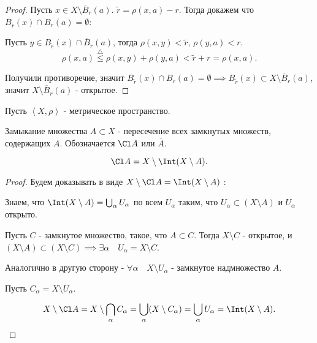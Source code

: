\begin{properties}
\begin{enumerate}
\begin{proof}
                Пусть $x\in X \setminus \overline{B}_{r}(a)$. $\tilde{r} = \rho(x, a) - r$. Тогда докажем что $B_{\tilde{r}}(x)\cap B_{r}(a) = \emptyset$:

                Пусть $y\in B_{\tilde{r}}(x)\cap \overline{B}_{r}(a)$, тогда $\rho(x, y) < \tilde{r}$, $\rho(y, a) < r$.
                \[ \rho(x, a) \overset{\triangle}{\le} \rho(x, y) + \rho(y, a) < \tilde{r} + r = \rho(x, a)  .\]

                Получили противоречие, значит $B_{\tilde{r}}(x)\cap B_{r}(a) = \emptyset \implies B_{\tilde{r}}(x) \subset X \setminus \overline{B}_{r}(a)$, значит $X \setminus \overline{B}_{r}(a)$ - открытое.
            \end{proof}
    \end{enumerate}
\end{properties}

\begin{definition} \thmslashn 

    Пусть $\left<X, \rho\right>$ - метрическое пространство.

    Замыкание множества $A \subset X$ - пересечение всех замкнутых множеств, содержащих $A$. Обозначается $\Cl A$ или $\overline{A}$.
\end{definition}

\begin{theorem} \thmslashn

    \[ \Cl A = X \setminus \Int (X \setminus A) .\]
    \begin{proof} \thmslashn
    
        Будем доказывать в виде $X \setminus \Cl A = \Int (X \setminus A)$ :

        Знаем, что $\Int (X \setminus A) = \bigcup_{\alpha} U_{\alpha}$ по всем $U_{\alpha}$ таким, что $U_{\alpha} \subset (X \setminus A)$ и $U_{\alpha}$ открыто.

        Пусть $C$ - замкнутое множество, такое, что $A \subset C$. Тогда $X \setminus C$ - открытое, и $(X \setminus A) \subset (X \setminus C) \implies \exists{\alpha}\quad U_{\alpha} = X \setminus C$.

        Аналогично в другую сторону - $\forall{\alpha}\quad X \setminus U_{\alpha}$ - замкнутое надмножество $A$.

        Пусть $C_{\alpha} = X \setminus U_{\alpha}$.

        \[ X \setminus \Cl A = X \setminus \bigcap_{\alpha} C_{\alpha} = \bigcup_{\alpha} (X \setminus C_{\alpha}) = \bigcup_{\alpha} U_{\alpha} = \Int (X \setminus A). \qedhere\] 


    \end{proof}
\end{theorem}
